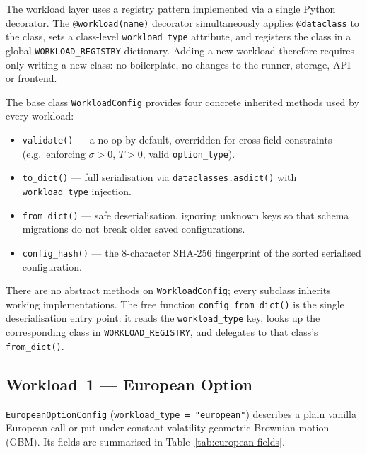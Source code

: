 The workload layer uses a registry pattern implemented via a single Python
decorator. The \texttt{@workload(name)} decorator simultaneously applies
\texttt{@dataclass} to the class, sets a class-level \texttt{workload\_type}
attribute, and registers the class in a global \texttt{WORKLOAD\_REGISTRY}
dictionary. Adding a new workload therefore requires only writing a new class:
no boilerplate, no changes to the runner, storage, API or frontend.

The base class \texttt{WorkloadConfig} provides four concrete inherited methods
used by every workload:

\begin{itemize}
    \item \texttt{validate()} --- a no-op by default, overridden for cross-field
          constraints (e.g.\ enforcing $\sigma > 0$, $T > 0$, valid
          \texttt{option\_type}).
    \item \texttt{to\_dict()} --- full serialisation via
          \texttt{dataclasses.asdict()} with \texttt{workload\_type} injection.
    \item \texttt{from\_dict()} --- safe deserialisation, ignoring unknown keys
          so that schema migrations do not break older saved configurations.
    \item \texttt{config\_hash()} --- the 8-character SHA-256 fingerprint of the
          sorted serialised configuration.
\end{itemize}

There are no abstract methods on \texttt{WorkloadConfig}; every subclass inherits
working implementations. The free function \texttt{config\_from\_dict()} is the
single deserialisation entry point: it reads the \texttt{workload\_type} key,
looks up the corresponding class in \texttt{WORKLOAD\_REGISTRY}, and delegates
to that class's \texttt{from\_dict()}.

\subsection{Workload~1 --- European Option}
\label{sec:workload-european}

\texttt{EuropeanOptionConfig} (\texttt{workload\_type = "european"}) describes a
plain vanilla European call or put under constant-volatility geometric Brownian
motion (GBM). Its fields are summarised in Table~\ref{tab:european-fields}.

